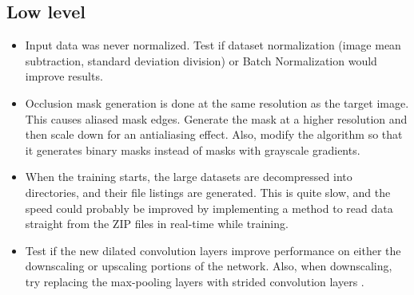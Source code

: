 \subsection{Low level}

\begin{itemize}
    \item Input data was never normalized. Test if dataset normalization (image mean subtraction, standard deviation
    division) or Batch Normalization \cite{Ioffe2015} would improve results.
    \item Occlusion mask generation is done at the same resolution as the target image. This causes aliased mask edges. Generate the mask at a higher resolution and then scale down for an antialiasing effect. Also, modify the algorithm so that it generates binary masks instead of masks with grayscale gradients.
    \item When the training starts, the large datasets are decompressed into directories, and their file listings are generated. This is quite slow, and the speed could probably be improved by implementing a method to read data straight from the ZIP files in real-time while training.
    \item Test if the new dilated convolution \cite{Yu2015} layers improve performance on either the downscaling or upscaling portions of the network. Also, when downscaling, try replacing the max-pooling layers with strided convolution layers \cite{Springen2014}.
\end{itemize}
